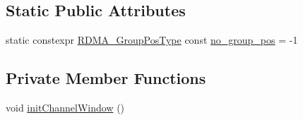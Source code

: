\subsection*{Static Public Attributes}
\begin{DoxyCompactItemize}
\item 
static constexpr \hyperlink{structvt_1_1rdma_1_1_channel_ae67759ab26cc035489edd369ae207cfc}{R\+D\+M\+A\+\_\+\+Group\+Pos\+Type} const \hyperlink{structvt_1_1rdma_1_1_channel_a5b8e4d79d272951f51a9856705110d24}{no\+\_\+group\+\_\+pos} = -\/1
\end{DoxyCompactItemize}
\subsection*{Private Member Functions}
\begin{DoxyCompactItemize}
\item 
void \hyperlink{structvt_1_1rdma_1_1_channel_a3712a0de4b68dc7cc2c8da2d040d732b}{init\+Channel\+Window} ()
\end{DoxyCompactItemize}
